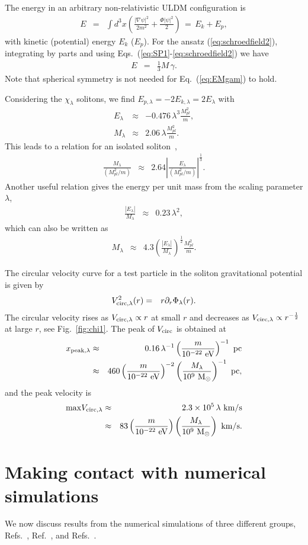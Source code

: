 \documentclass[aps,prd,floats,superscriptaddress,showpacs,nofootinbib,twocolumn,preprintnumbers]{revtex4-1}%
\def\be{\begin{eqnarray}}
\def\ee{\end{eqnarray}}
\def\no{\nonumber}
\begin{document}
The energy in an arbitrary non-relativistic ULDM configuration is
%
\be \label{eq:Egen}E&=&\int d^3x\left(
\frac{\left|\nabla\psi\right|^2}{2m^2}+\frac{\Phi\left|\psi\right|^2}{2}\right)\,=\,E_k+E_p,\ee
%
with kinetic (potential) energy $E_k$ ($E_p$).  
For the ansatz (\ref{eq:schroedfield2}), integrating by parts and using Eqs.~(\ref{eq:SP1}-\ref{eq:schroedfield2}) we have
%
\be \label{eq:EMgam}E&=&\frac{1}{3}M\,\gamma.\ee
%
Note that spherical symmetry is not needed for Eq.~(\ref{eq:EMgam}) to hold. 

Considering the $\chi_\lambda$ solitons, we find $E_{p,\lambda}=-2E_{k,\lambda}=2E_{\lambda}$ with
%
\be E_\lambda&\approx&-0.476\,\lambda^3\frac{M_{pl}^2}{m},\\
M_\lambda&\approx&2.06\,\lambda\frac{M_{pl}^2}{m}.\ee
%
This leads to a relation for an isolated soliton~\cite{Chavanis:2011zi,Chavanis:2011zm},
%
\be\label{eq:MEsol} \frac{M_\lambda}{(M_{pl}^2/m)}&\approx&2.64\left|\frac{E_\lambda}{(M_{pl}^2/m)}\right|^{\frac{1}{3}}.\ee
%
Another useful relation gives the energy per unit mass from the scaling parameter $\lambda$,
%
\be\label{eq:E2M}\frac{|E_\lambda|}{M_\lambda}&\approx&0.23\,\lambda^2,\ee
%
which can also be written as
%
\be\label{eq:MlamSchieve} M_\lambda&\approx&4.3\left(\frac{|E_\lambda|}{M_\lambda}\right)^{\frac{1}{2}}\frac{M_{pl}^2}{m}.
\ee
%

The circular velocity curve for a test particle in the soliton gravitational potential is given by
%
\be V_{\rm circ,\lambda}^2(r)&=&r\partial_r\Phi_{\lambda}(r).\ee
%
The circular velocity rises as $V_{\rm circ,\lambda}\propto r$ at
small $r$ and decreases as $V_{\rm circ,\lambda}\propto
r^{-\frac{1}{2}}$ at large $r$, see Fig.~\ref{fig:chi1}. 
The peak of $V_{\rm circ}$ is obtained at
%
\be\label{eq:xpeakVc} x_{\rm peak,\lambda}&\approx&0.16\,\lambda^{-1}\left(\frac{m}{10^{-22}~\rm eV}\right)^{-1}~{\rm pc}\\
&\approx&460\left(\frac{m}{10^{-22}~\rm eV}\right)^{-2}\left(\frac{M_\lambda}{10^9~{\rm M_{\odot}}}\right)^{-1}~{\rm pc},\no\ee
%
and the peak velocity is
%
\be\label{eq:maxVc} {\rm max}V_{\rm circ,\lambda}&\approx&2.3\times10^5\,\lambda~{\rm km/s}\\
&\approx&83\left(\frac{m}{10^{-22}~\rm eV}\right)\left(\frac{M_\lambda}{10^9~{\rm M_{\odot}}}\right)~{\rm km/s}.\no\ee
%




\section{Making contact with numerical simulations}\label{s:sim}
We now discuss results from the numerical simulations of three different groups, Refs.~\cite{Schive:2014hza,Schive:2014dra}, Ref.~\cite{Mocz:2017wlg}, and Refs.~\cite{Veltmaat:2016rxo,Schwabe:2016rze}.%
\end{document}
